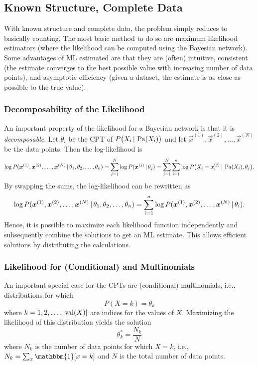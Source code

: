 		\subsection{Known Structure, Complete Data}
			With known structure and complete data, the problem simply reduces to basically counting. The most basic method to do so are maximum likelihood estimators (where the likelihood can be computed using the Bayesian network). Some advantages of ML estimated are that they are (often) intuitive, consistent (the estimate converges to the best possible value with increasing number of data points), and asymptotic efficiency (given a dataset, the estimate is as close as possible to the true value).

			\subsubsection{Decomposability of the Likelihood}
				An important property of the likelihood for a Bayesian network is that it is \emph{decomposable}. Let \( \theta_i \) be the CPT of \( P\bigl(X_i \,\vert\, \operatorname{Pa}(X_i) \bigr) \) and let \( \vec{x}^{(1)}, \vec{x}^{(2)}, \dots, \vec{x}^{(N)} \) be the data points. Then the log-likelihood is
				\begin{equation}
					\log P(\bm{x}^{(1)}, \bm{x}^{(2)}, \dots, \bm{x}^{(N)} \,\vert\, \theta_1, \theta_2, \dots, \theta_n)
						= \sum_{j = 1}^{N} \log P(\bm{x}^{(j)} \,\vert\, \theta_j)
						= \sum_{j = 1}^{N} \sum_{i = 1}^{n} \log P\bigl(X_i = x_i^{(j)} \,\big\vert\, \operatorname{Pa}(X_i), \theta_j \bigr).
				\end{equation}
				By swapping the sums, the log-likelihood can be rewritten as
				\begin{equation}
					\log P(\bm{x}^{(1)}, \bm{x}^{(2)}, \dots, \bm{x}^{(N)} \,\vert\, \theta_1, \theta_2, \dots, \theta_n)
						= \sum_{i = 1}^{n} \log P(\bm{x}^{(1)}, \bm{x}^{(2)}, \dots, \bm{x}^{(N)} \,\vert\, \theta_i).
				\end{equation}
				Hence, it is possible to maximize each likelihood function independently and subsequently combine the solutions to get an ML estimate. This allows efficient solutions by distributing the calculations.

			\subsubsection{Likelihood for (Conditional) and Multinomials}
				An important special case for the CPTs are (conditional) multinomials, i.e., distributions for which
				\begin{equation}
					P(X = k) = \theta_k
				\end{equation}
				where \( k = 1, 2, \dots, \lvert \operatorname{val}(X) \rvert \) are indices for the values of \(X\). Maximizing the likelihood of this distribution yields the solution
				\begin{equation}
					\theta_k^\ast = \frac{N_k}{N}
				\end{equation}
				where \( N_k \) is the number of data points for which \( X = k \), i.e., \( N_k = \sum_x \mathbbm{1}[x = k] \) and \(N\) is the total number of data points.

